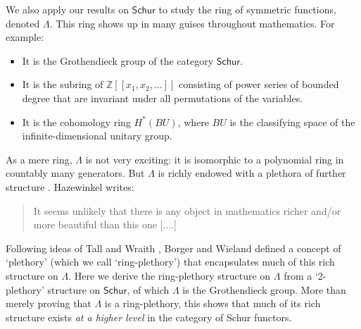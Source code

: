 \documentclass[12pt,reqno]{amsart}
\theoremstyle{plain}
\theoremstyle{definition}
\theoremstyle{remark}
\newcommand{\Z}{\mathbb Z}
\newcommand{\namedcat}[1]{\mathsf{#1}}
\newcommand{\Schur}{\namedcat{Schur}}
\numberwithin{thm}{section}
\begin{document}
We also apply our results on $\Schur$ to study the ring of symmetric functions, denoted $\Lambda$. This ring shows up in many guises throughout mathematics. For example:
\begin{itemize}
    \item It is the Grothendieck group of the category $\Schur$.
    \item It is the subring of $\Z[[x_1, x_2, \dots]]$ consisting of power series of bounded degree that are invariant under all permutations of the variables.
    \item It is the cohomology ring $H^*(BU)$, where $BU$ is the classifying space of the infinite-dimensional unitary group.
\end{itemize}
As a mere ring, $\Lambda$ is not very exciting: it is isomorphic to a polynomial ring in countably many generators. But $\Lambda$ is richly endowed with a plethora of further structure \cite{MacDonald, Egge}. Hazewinkel \cite{Hazewinkel} writes:
\begin{quote}
    It seems unlikely that there is any object in mathematics richer and/or more beautiful than this one [....]
\end{quote}

Following ideas of Tall and Wraith \cite{TallWraith}, Borger and Wieland \cite{Plethystic} defined a concept of `plethory' (which we call `ring-plethory') that encapsulates much of this rich structure on $\Lambda$. Here we derive the ring-plethory structure on $\Lambda$ from a `2-plethory' structure on $\Schur$, of which $\Lambda$ is the Grothendieck group. More than merely proving that $\Lambda$ is a ring-plethory, this shows that much of its rich structure exists \emph{at a higher level} in the category of Schur functors.
\end{document}

